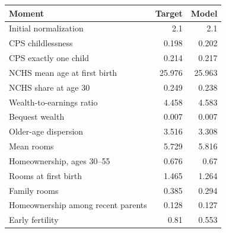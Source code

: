 \begingroup\small
\setlength{\tabcolsep}{3pt}
\renewcommand{\arraystretch}{1.04}
\begin{tabularx}{\linewidth}{Xrr}
\toprule
Moment & Target & Model \\
\midrule
Initial normalization & 2.1 & 2.1 \\
CPS childlessness & 0.198 & 0.202 \\
CPS exactly one child & 0.214 & 0.217 \\
NCHS mean age at first birth & 25.976 & 25.963 \\
NCHS share at age 30 & 0.249 & 0.238 \\
Wealth-to-earnings ratio & 4.458 & 4.583 \\
Bequest wealth & 0.007 & 0.007 \\
Older-age dispersion & 3.516 & 3.308 \\
Mean rooms & 5.729 & 5.816 \\
Homeownership, ages 30--55 & 0.676 & 0.67 \\
Rooms at first birth & 1.465 & 1.264 \\
Family rooms & 0.385 & 0.294 \\
Homeownership among recent parents & 0.128 & 0.127 \\
Early fertility & 0.81 & 0.553 \\
\bottomrule
\end{tabularx}
\endgroup
